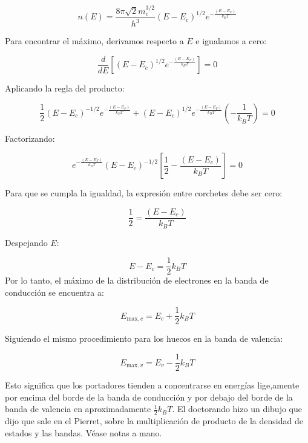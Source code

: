 \begin{enumerate}[label=\alph*)]
		  \[
			  n(E) = \frac{8\pi \sqrt{2} m_c^{3/2}}{h^3} (E - E_c)^{1/2} e^{-\frac{(E - E_F)}{k_B T}}
		  \]

		  Para encontrar el máximo, derivamos respecto a \( E \) e igualamos a cero:

		  \[
			  \frac{d}{dE} \left[ (E - E_c)^{1/2} e^{-\frac{(E - E_F)}{k_B T}} \right] = 0
		  \]

		  Aplicando la regla del producto:

		  \[
			  \frac{1}{2} (E - E_c)^{-1/2} e^{-\frac{(E - E_F)}{k_B T}} + (E - E_c)^{1/2} e^{-\frac{(E - E_F)}{k_B T}} \left(-\frac{1}{k_B T} \right) = 0
		  \]

		  Factorizando:

		  \[
			  e^{-\frac{(E - E_F)}{k_B T}} (E - E_c)^{-1/2} \left[ \frac{1}{2} - \frac{(E - E_c)}{k_B T} \right] = 0
		  \]

		  Para que se cumpla la igualdad, la expresión entre corchetes debe ser cero:

		  \[
			  \frac{1}{2} = \frac{(E - E_c)}{k_B T}
		  \]

		  Despejando \( E \):

		  \[
			  E - E_c = \frac{1}{2} k_B T
		  \]
		  Por lo tanto, el máximo de la distribución de electrones en la banda de conducción se encuentra a:

		  \[
			  E_{\text{max}, c} = E_c + \frac{1}{2} k_B T
		  \]

		  Siguiendo el mismo procedimiento para los huecos en la banda de valencia:

		  \[
			  E_{\text{max}, v} = E_v - \frac{1}{2} k_B T
		  \]

		  Esto significa que los portadores tienden a concentrarse en energías lige,amente por encima del borde de la banda de conducción y por debajo del borde de la banda de valencia en aproximadamente \( \frac{1}{2} k_B T \). El doctorando hizo un dibujo que dijo que sale en el Pierret, sobre la multiplicación de producto de la densidad de estados y las bandas. Véase notas a mano.

\end{enumerate}


